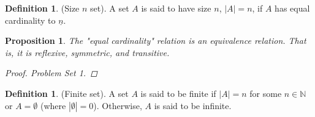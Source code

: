 \documentclass[10pt]{article}
\newcommand{\N}{\mathbb{N}}
\newcommand{\abs}[1]{\left| #1 \right|}
\newtheorem{proposition}[theorem]{Proposition}
\theoremstyle{definition}
\newtheorem{definition}[theorem]{Definition}
\theoremstyle{remark}
\begin{document}
\begin{definition}
    (Size $n$ set).
    A set $A$ is said to have size $n$, $\abs{A} = n$, if $A$ has equal cardinality to $\underline{n}$.
\end{definition}

\begin{proposition}
    The "equal cardinality" relation is an equivalence relation. That is, it is reflexive, symmetric, and transitive.
    \begin{proof}
        Problem Set 1.
    \end{proof}
\end{proposition}

\begin{definition}
    (Finite set).
    A set $A$ is said to be finite if $\abs{A} = n$ for some $n \in \N$ or $A = \emptyset$
    (where $\abs{\emptyset} = 0$).
    Otherwise, $A$ is said to be infinite.
\end{definition}
\end{document}
